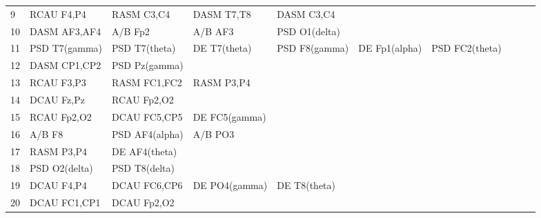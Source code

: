 \begin{landscape}
\begin{table}[]
\begin{tabular}{l|llllllll}
9        & RCAU F4,P4     & RASM C3,C4     & DASM T7,T8     & DASM C3,C4     &                &                &               &                &               &               \\
10       & DASM AF3,AF4   & A/B Fp2        & A/B AF3        & PSD O1(delta)  &                &                &               &                &               &               \\
11       & PSD T7(gamma)  & PSD T7(theta)  & DE T7(theta)   & PSD F8(gamma)  & DE Fp1(alpha)  & PSD FC2(theta) &               &                &               &               \\
12       & DASM CP1,CP2   & PSD Pz(gamma)  &                &                &                &                &               &                &               &               \\
13       & RCAU F3,P3     & RASM FC1,FC2   & RASM P3,P4     &                &                &                &               &                &               &               \\
14       & DCAU Fz,Pz     & RCAU Fp2,O2    &                &                &                &                &               &                &               &               \\
15       & RCAU Fp2,O2    & DCAU FC5,CP5   & DE FC5(gamma)  &                &                &                &               &                &               &               \\
16       & A/B F8         & PSD AF4(alpha) & A/B PO3        &                &                &                &               &                &               &               \\
17       & RASM P3,P4     & DE AF4(theta)  &                &                &                &                &               &                &               &               \\
18       & PSD O2(delta)  & PSD T8(delta)  &                &                &                &                &               &                &               &               \\
19       & DCAU F4,P4     & DCAU FC6,CP6   & DE PO4(gamma)  & DE T8(theta)   &                &                &               &                &               &               \\
20       & DCAU FC1,CP1   & DCAU Fp2,O2    &                &                &                &                &               &                &               &               \\

\end{tabular}
\end{table}
\end{landscape}
